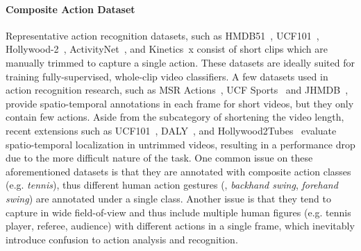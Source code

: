 \documentclass[10pt,twocolumn,letterpaper]{article}
\begin{document}
\paragraph{Composite Action Dataset}
Representative action recognition datasets, such as HMDB51~\cite{HMDB51}, UCF101~\cite{ucf101}, Hollywood-2~\cite{DBLP:conf/cvpr/MarszalekLS09}, ActivityNet~\cite{activitynet}, and Kinetics~\cite{kinetics700,kinetics400}x     consist of short clips which are manually trimmed to capture a single action. These datasets are ideally suited for training fully-supervised, whole-clip video classifiers. A few datasets used in action recognition research, such as MSR Actions~\cite{DBLP:conf/cvpr/YuanLW09}, UCF Sports~\cite{DBLP:conf/cvpr/RodriguezAS08} and JHMDB~\cite{DBLP:conf/iccv/JhuangGZSB13}, provide spatio-temporal annotations in each frame for short videos, but they only contain few actions. 
Aside from the subcategory of shortening the video length, recent extensions such as UCF101~\cite{ucf101}, DALY~\cite{DBLP:journals/corr/WeinzaepfelMS16}, and Hollywood2Tubes~\cite{DBLP:conf/eccv/MettesGS16} evaluate spatio-temporal localization in untrimmed videos, resulting in a performance drop due to the more difficult nature of the task. One common issue on these aforementioned datasets is that they are annotated with composite action classes (e.g. \textit{tennis}), thus different human action gestures (\eg, \textit{backhand swing}, \textit{forehand swing}) are annotated under a single class. Another  issue is that they tend to capture in wide field-of-view and thus include multiple human figures (e.g. tennis player, referee, audience) with different actions in a single frame, which inevitably introduce confusion to action analysis and recognition. 
\end{document}
